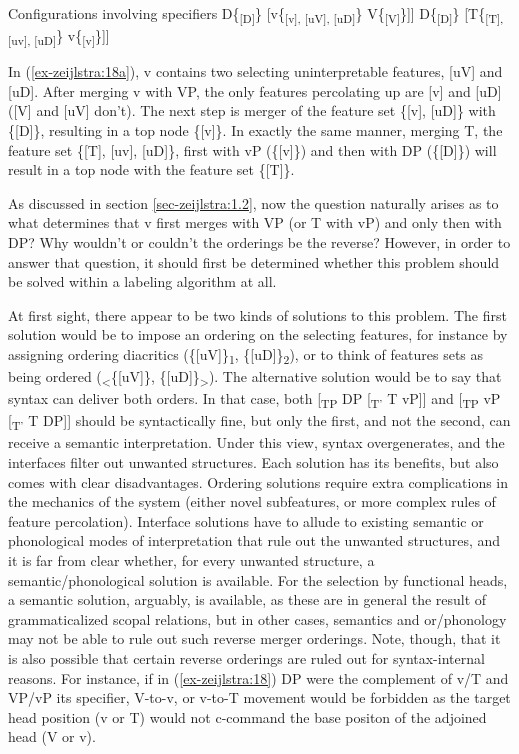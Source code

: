 \documentclass[output=paper
,modfonts
,nonflat]{langsci/langscibook}
\begin{document}
\begin{exe}
	\ex Configurations involving specifiers \label{ex-zeijlstra:18}
		\xlist
		\ex {[}D\{\textsubscript{{[}D{]}}\} \label{ex-zeijlstra:18a} {[}v\{\textsubscript{{[}v{]}, {[}uV{]}, {[}uD{]}}\} V\{\textsubscript{{[}V{]}}\}{]}{]}
		\ex {[}D\{\textsubscript{{[}D{]}}\} {[}T\{\textsubscript{{[}T{]}, {[}uv{]}, {[}uD{]}}\} v\{\textsubscript{{[}v{]}}\}{]}{]}
		\endxlist
	\end{exe}
In (\ref{ex-zeijlstra:18a}), v contains two selecting uninterpretable features, [uV] and [uD]. After merging v with VP, the only features percolating up are [v] and [uD] ([V] and [uV] don’t). The next step is merger of the feature set \{[v], [uD]\} with \{[D]\}, resulting in a top node \{[v]\}. In exactly the same manner, merging T, the feature set \{[T], [uv], [uD]\}, first with vP (\{[v]\}) and then with DP (\{[D]\}) will result in a top node with the feature set \{[T]\}.

As discussed in section \ref{sec-zeijlstra:1.2}, now the question naturally arises as to what determines that v first merges with VP (or T with vP) and only then with DP? Why wouldn’t or couldn’t the orderings be the reverse? However, in order to answer that question, it should first be determined whether this problem should be solved within a labeling algorithm at all.

At first sight, there appear to be two kinds of solutions to this problem. The first solution would be to impose an ordering on the selecting features, for instance by assigning ordering diacritics (\{[uV]\}\textsubscript{1}, \{[uD]\}\textsubscript{2}), or to think of features sets as being ordered (\textsubscript{<}\{[uV]\}, \{[uD]\}\textsubscript{>}). The alternative solution would be to say that syntax can deliver both orders. In that case, both [\textsubscript{TP} DP [\textsubscript{T’} T vP]] and [\textsubscript{TP} vP [\textsubscript{T’} T DP]] should be syntactically fine, but only the first, and not the second, can receive a semantic interpretation. Under this view, syntax overgenerates, and the interfaces filter out unwanted structures. Each solution has its benefits, but also comes with clear disadvantages. Ordering solutions require extra complications in the mechanics of the system (either novel subfeatures, or more complex rules of feature percolation). Interface solutions have to allude to existing semantic or phonological modes of interpretation that rule out the unwanted structures, and it is far from clear whether, for every unwanted structure, a semantic/phonological solution is available. For the selection by functional heads, a semantic solution, arguably, is available, as these are in general the result of grammaticalized scopal relations, but in other cases, semantics and or/phonology may not be able to rule out such reverse merger orderings. Note, though, that it is also possible that certain reverse orderings are ruled out for syntax-internal reasons. For instance, if in (\ref{ex-zeijlstra:18}) DP were the complement of v/T and VP/vP its specifier, V-to-v, or v-to-T movement would be forbidden as the target head position (v or T) would not c-command the base positon of the adjoined head (V or v).
\end{document}
